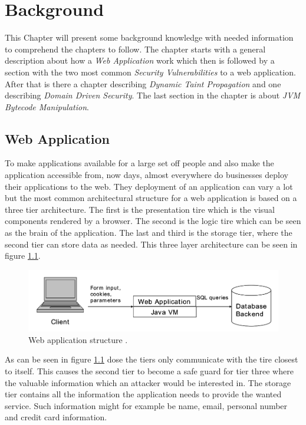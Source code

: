 \chapter{Background}
This Chapter will present some background knowledge with needed information to comprehend the chapters to follow. The chapter starts with a general description about how a \textit{Web Application} work which then is followed by a section with the two most common \textit{Security Vulnerabilities} to a web application. After that is there a chapter describing \textit{Dynamic Taint Propagation} and one describing \textit{Domain Driven Security}. The last section in the chapter is about \textit{JVM Bytecode Manipulation}.


\section{Web Application}
To make applications available for a large set off people and also make the application accessible from, now days, almost everywhere do businesses deploy their applications to the web. They deployment of an application can vary a lot but the most common architectural structure for a web application is based on a three tier architecture. The first is the presentation tire which is the visual components rendered by a browser. The second is the logic tire which can be seen as the brain of the application. The last and third is the storage tier, where the second tier can store data as needed. \parencite{JustinClarke-Salt2009SIAa} This three layer architecture can be seen in figure \ref{fig:webApplication-Haldar}.

\begin{figure}
  \centering
  \includegraphics[width=\textwidth]{images/webApplication-Haldar.png}
  \caption{Web application structure \cite{Haldar}.}
  \label{fig:webApplication-Haldar}
\end{figure}

As can be seen in figure \ref{fig:webApplication-Haldar} dose the tiers only communicate with the tire closest to itself. This causes the second tier to become a safe guard for tier three where the valuable information which an attacker would be interested in. The storage tier contains all the information the application needs to provide the wanted service. Such information might for example be name, email, personal number and credit card information. \parencite{JustinClarke-Salt2009SIAa}


